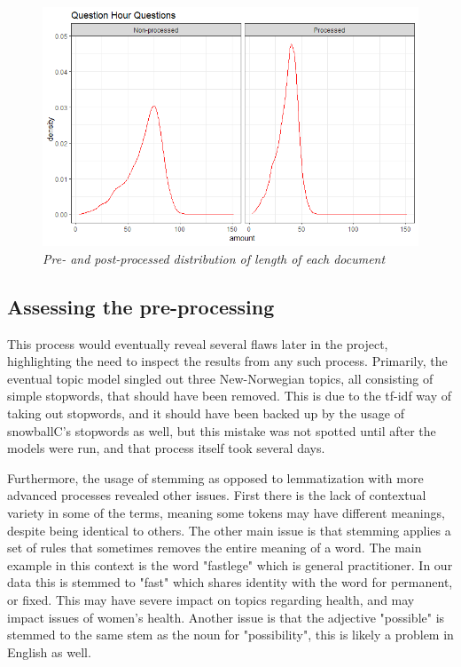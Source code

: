 \documentclass[12pt]{article}
\begin{document}
\begin{figure}[ht]
		\includegraphics[scale=0.40]{Img/prepostsporretimesporsmal.PNG}
		\caption{\textit{Pre- and post-processed distribution of length of each document}}
	\end{figure}
	
	\subsection{Assessing the pre-processing}
	
	This process would eventually reveal several flaws later in the project, highlighting the need to inspect the results from any such process. Primarily, the eventual topic model singled out three New-Norwegian topics, all consisting of simple stopwords, that should have been removed. This is due to the tf-idf way of taking out stopwords, and it should have been backed up by the usage of snowballC's stopwords as well, but this mistake was not spotted until after the models were run, and that process itself took several days.
	
	Furthermore, the usage of stemming as opposed to lemmatization with more advanced processes revealed other issues. First there is the lack of contextual variety in some of the terms, meaning some tokens may have different meanings, despite being identical to others. The other main issue is that stemming applies a set of rules that sometimes removes the entire meaning of a word. The main example in this context is the word "fastlege" which is general practitioner. In our data this is stemmed to "fast" which shares identity with the word for permanent, or fixed. This may have severe impact on topics regarding health, and may impact issues of women's health. Another issue is that the adjective "possible" is stemmed to the same stem as the noun for "possibility", this is likely a problem in English as well.
	
\end{document}
